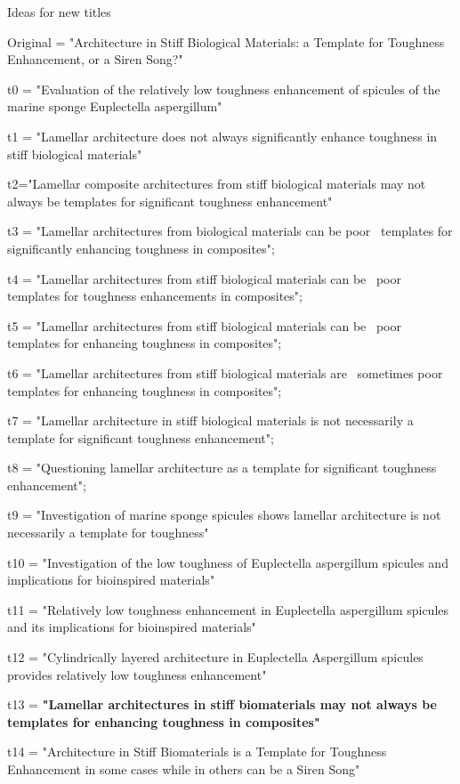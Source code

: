 \documentclass[11pt,letterpaper]{report}
\begin{document}
Ideas for new titles

Original = "Architecture in Stiff Biological Materials: a Template for Toughness Enhancement, or a Siren Song?"

t0 = "Evaluation of the relatively low toughness enhancement of spicules of the marine sponge Euplectella aspergillum"

t1 = "Lamellar architecture does not always significantly enhance toughness in stiff biological materials"

t2="Lamellar composite architectures from stiff biological materials may not always be templates for significant toughness enhancement"

t3 = "Lamellar architectures from biological materials can be poor \
templates for significantly enhancing toughness in composites";

t4 = "Lamellar architectures from stiff biological materials can be \
poor templates for  toughness enhancements in composites";

t5 = "Lamellar architectures from stiff biological materials can be \
poor templates for enhancing toughness in composites";

t6 = "Lamellar architectures from stiff biological materials are \
sometimes poor templates for enhancing toughness in composites";

t7 = "Lamellar architecture in stiff biological materials is not necessarily a template for significant toughness enhancement";

t8 = "Questioning lamellar architecture as a template for significant toughness enhancement";

t9 = "Investigation of marine sponge spicules shows lamellar architecture is not necessarily a template for toughness"

t10 = "Investigation of the low toughness of Euplectella aspergillum spicules and implications for bioinspired materials"

t11 = "Relatively low toughness enhancement in Euplectella aspergillum spicules and its implications for bioinspired materials"

t12 = "Cylindrically layered architecture in Euplectella Aspergillum spicules provides relatively low toughness enhancement"

t13 = \textbf{"Lamellar architectures in stiff biomaterials may not always be templates for enhancing toughness in composites"}

t14 = "Architecture in Stiff Biomaterials is  a Template for Toughness Enhancement in some cases while in others can be a Siren Song"
\end{document}
